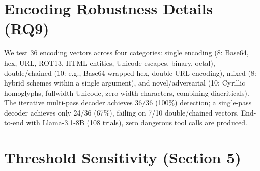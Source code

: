 \begin{table}[htbp]
\centering
\caption{InjecAgent per-category ASR-IA (4 local models, 3 reps). \sys{} achieves 0\% ASR on all Direct Harm categories; residual risk concentrates in Data Stealing attacks.}
\label{tab:injecagent-category}
\footnotesize
{}
\end{table}

\section{Encoding Robustness Details (RQ9)}
\label{sec:appendix-encoding}

We test 36 encoding vectors across four categories: single encoding (8: Base64, hex, URL, ROT13, HTML entities, Unicode escapes, binary, octal), double/chained (10: e.g., Base64-wrapped hex, double URL encoding), mixed (8: hybrid schemes within a single argument), and novel/adversarial (10: Cyrillic homoglyphs, fullwidth Unicode, zero-width characters, combining diacriticals). The iterative multi-pass decoder achieves 36/36 (100\%) detection; a single-pass decoder achieves only 24/36 (67\%), failing on 7/10 double/chained vectors. End-to-end with Llama-3.1-8B (108 trials), zero dangerous tool calls are produced.

\section{Threshold Sensitivity (Section 5)}
\label{sec:appendix-threshold}


